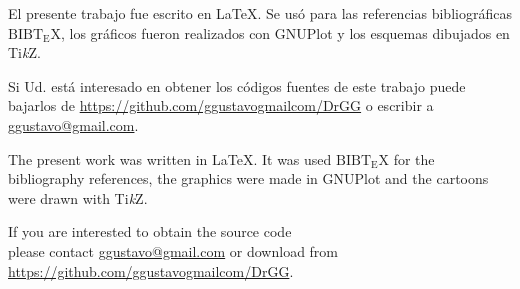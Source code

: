   \thispagestyle{empty}	
  \begin{flushright}
    \vspace*{\fill}
    {\cirth \color{black}{gg}}
    \vspace*{0.1mm}
    \end{flushright}
\cleardoublepage

\vspace*{\fill}
 \begin{center}
	\begin{minipage}{0.70\textwidth}
	
    \begin{center}
	\scriptsize{
		El presente trabajo fue escrito en \LaTeX. Se usó para las referencias bibliográficas $\mathrm{B{\scriptstyle{IB}} \! T\!_{\displaystyle E} \! X}$, los gráficos fueron realizados con GNUPlot y los esquemas dibujados en Ti\textit{k}Z.
		
		\vspace*{1mm}
		
		Si Ud. está interesado en obtener los códigos fuentes de este trabajo puede bajarlos de 
		\url{https://github.com/ggustavogmailcom/DrGG} o escribir a \href{mailto:ggustavo@gmail.com}{ggustavo@gmail.com}.
		
		\vspace*{1cm}
		
		The present work was written in \LaTeX. It was used $\mathrm{B{\scriptstyle{IB}} \! T\!_{\displaystyle E} \! X}$ for the bibliography references, the graphics were made in GNUPlot and the cartoons were drawn with Ti\textit{k}Z.
			
		\vspace*{1mm}
		
		If you are interested to obtain the source code \\ please contact \href{mailto:ggustavo@gmail.com}{ggustavo@gmail.com} or download from \url{https://github.com/ggustavogmailcom/DrGG}.
		}

	\end{center}

	\end{minipage}
	\vspace*{\fill}
 \end{center}